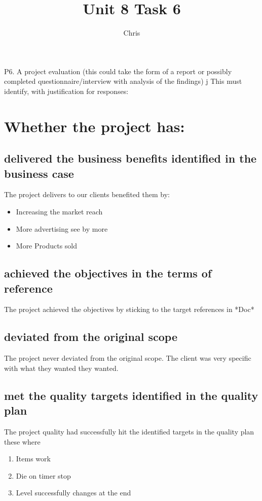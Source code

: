 \documentclass{article}
\begin{document}
\title{Unit 8 Task 6}
\author{Chris}
\date{}
\maketitle

P6. A project evaluation (this could take the form of a report or possibly completed
questionnaire/interview with analysis of the findings)
j
This must identify, with justification for responses:

\section{Whether the project has:}
	\subsection{delivered the business benefits identified in the business case}
	The project delivers to our clients benefited them by:
	\begin{itemize}
		\item  Increasing the market reach 
		\item More advertising see by more
		\item More Products sold
	\end{itemize}

	\subsection{achieved the objectives in the terms of reference}
	The project achieved the objectives by sticking to the target references in *Doc*

	\subsection{deviated from the original scope}
	The project never deviated from the original scope. The client was very specific with what they wanted they wanted.

	\subsection{met the quality targets identified in the quality plan}
	The project quality had successfully hit the identified targets in the quality plan these where
	\begin{enumerate}
		\item Items work
		\item Die on timer stop
		\item Level successfully changes at the end
	\end{enumerate}
\end{document}
